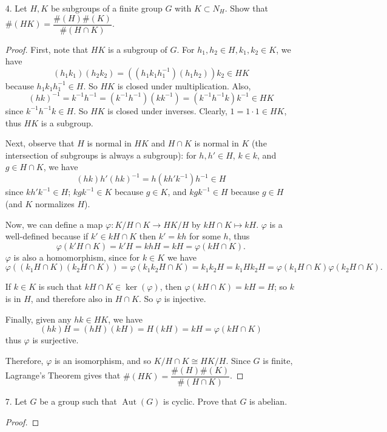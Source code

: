 \documentclass[10pt]{article}
\DeclareMathOperator*{\Aut}{Aut}
\begin{document}
\begin{enumerate}
\item[4.] Let $H,K$ be subgroups of a finite group $G$ with $K \subset N_H$.  Show that $\#(HK) = \dfrac{\#(H)\#(K)}{\#(H\cap K)}$.

\begin{proof}
First, note that $HK$ is a subgroup of $G$.  For $h_1,h_2 \in H, k_1,k_2 \in K$, we have $$(h_1k_1)(h_2k_2) = ((h_1k_1h_1^{-1})(h_1h_2))k_2 \in HK$$ because $h_1 k_1 h_1^{-1} \in H$.  So $HK$ is closed under multiplication.  Also,
$$
(hk)^{-1} = k^{-1}h^{-1} = (k^{-1}h^{-1})(kk^{-1}) = (k^{-1}h^{-1}k)k^{-1} \in HK
$$
since $k^{-1}h^{-1}k \in H$.  So $HK$ is closed under inverses.  Clearly, $1 = 1 \cdot 1 \in HK$, thus $HK$ is a subgroup.

Next, observe that $H$ is normal in $HK$ and $H \cap K$ is normal in $K$ (the intersection of subgroups is always a subgroup): for $h, h' \in H$, $k \in k$, and $g \in H \cap K$, we have
$$
(hk)h'(hk)^{-1} = h(kh'k^{-1})h^{-1} \in H
$$
since $k h' k^{-1} \in H$; $kgk^{-1} \in K$ because $g \in K$, and $kgk^{-1} \in H$ because $g \in H$ (and $K$ normalizes $H$).

Now, we can define a map $\varphi: K / H \cap K \rightarrow HK / H$ by $k H\cap K \mapsto kH$.  $\varphi$ is a well-defined because if $k' \in k H \cap K$ then $k' = kh$ for some $h$, thus
$$
\varphi(k' H \cap K) = k'H = khH = kH = \varphi(k H \cap K).
$$
$\varphi$ is also a homomorphism, since for $k \in K$ we have $$\varphi((k_1H\cap K)(k_2H \cap K)) = \varphi(k_1k_2 H \cap K) = k_1k_2 H = k_1 H k_2 H = \varphi(k_1H\cap K) \varphi(k_2H \cap K).$$

If $k \in K$ is such that $k H\cap K \in \ker (\varphi)$, then $\varphi(k H\cap K) = kH = H$; so $k$ is in $H$, and therefore also in $H \cap K$.  So $\varphi$ is injective.

Finally, given any $hk \in HK$, we have
$$
(hk)H = (hH)(kH) = H(kH) = kH = \varphi(k H\cap K)
$$
thus $\varphi$ is surjective.

Therefore, $\varphi$ is an isomorphism, and so $K / H \cap K \cong HK / H$.  Since $G$ is finite, Lagrange's Theorem gives that $\#(HK) = \dfrac{\#(H)\#(K)}{\#(H\cap K)}$.
\end{proof}

\item[7.] Let $G$ be a group such that $\Aut (G)$ is cyclic.  Prove that $G$ is abelian.

\newcommand{\cc}{$\textbf{c}$}

\begin{proof}


\end{proof}
\end{enumerate}
\end{document}
